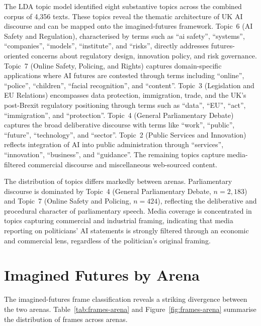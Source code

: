 The LDA topic model identified eight substantive topics across the combined corpus of 4,356 texts. These topics reveal the thematic architecture of UK AI discourse and can be mapped onto the imagined-futures framework. Topic~6 (AI Safety and Regulation), characterised by terms such as ``ai safety'', ``systems'', ``companies'', ``models'', ``institute'', and ``risks'', directly addresses futures-oriented concerns about regulatory design, innovation policy, and risk governance. Topic~7 (Online Safety, Policing, and Rights) captures domain-specific applications where AI futures are contested through terms including ``online'', ``police'', ``children'', ``facial recognition'', and ``content''. Topic~3 (Legislation and EU Relations) encompasses data protection, immigration, trade, and the UK's post-Brexit regulatory positioning through terms such as ``data'', ``EU'', ``act'', ``immigration'', and ``protection''. Topic~4 (General Parliamentary Debate) captures the broad deliberative discourse with terms like ``work'', ``public'', ``future'', ``technology'', and ``sector''. Topic~2 (Public Services and Innovation) reflects integration of AI into public administration through ``services'', ``innovation'', ``business'', and ``guidance''. The remaining topics capture media-filtered commercial discourse and miscellaneous web-sourced content.

The distribution of topics differs markedly between arenas. Parliamentary discourse is dominated by Topic~4 (General Parliamentary Debate, $n=2{,}183$) and Topic~7 (Online Safety and Policing, $n=424$), reflecting the deliberative and procedural character of parliamentary speech. Media coverage is concentrated in topics capturing commercial and industrial framing, indicating that media reporting on politicians' AI statements is strongly filtered through an economic and commercial lens, regardless of the politician's original framing.

\section{Imagined Futures by Arena}

The imagined-futures frame classification reveals a striking divergence between the two arenas. Table~\ref{tab:frames-arena} and Figure~\ref{fig:frames-arena} summarise the distribution of frames across arenas.


